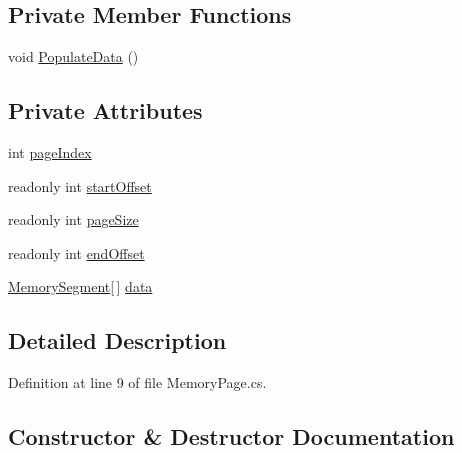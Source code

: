 \subsection*{Private Member Functions}
\begin{DoxyCompactItemize}
\item 
void \hyperlink{class_c_p_u___o_s___simulator_1_1_memory_1_1_memory_page_a4006da1460cb3bf17076dfbade9d0038}{Populate\+Data} ()
\end{DoxyCompactItemize}
\subsection*{Private Attributes}
\begin{DoxyCompactItemize}
\item 
int \hyperlink{class_c_p_u___o_s___simulator_1_1_memory_1_1_memory_page_acf60a7bdefab6120fe080854b5f0b38b}{page\+Index}
\item 
readonly int \hyperlink{class_c_p_u___o_s___simulator_1_1_memory_1_1_memory_page_a6fe2e28385db19a1968a41efe3df3f38}{start\+Offset}
\item 
readonly int \hyperlink{class_c_p_u___o_s___simulator_1_1_memory_1_1_memory_page_abbbd3ea0ef99dac19c6bd9694dbdfd3a}{page\+Size}
\item 
readonly int \hyperlink{class_c_p_u___o_s___simulator_1_1_memory_1_1_memory_page_ae2f8f419909326ce5449d37af9ff7c89}{end\+Offset}
\item 
\hyperlink{class_c_p_u___o_s___simulator_1_1_memory_1_1_memory_segment}{Memory\+Segment}\mbox{[}$\,$\mbox{]} \hyperlink{class_c_p_u___o_s___simulator_1_1_memory_1_1_memory_page_af9ab25101e7920de2344e0fa5ddfaa27}{data}
\end{DoxyCompactItemize}


\subsection{Detailed Description}


Definition at line 9 of file Memory\+Page.\+cs.



\subsection{Constructor \& Destructor Documentation}
\hypertarget{class_c_p_u___o_s___simulator_1_1_memory_1_1_memory_page_ab471d5de4e2b4e5f6585ae3782fa2ae7}{}
